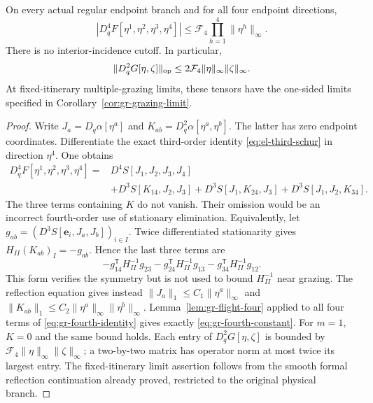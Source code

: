 \begin{theorem}
\label{thm:gr-fourth}
On every actual regular endpoint branch and for all four endpoint
directions,
\begin{equation}\label{eq:gr-fourth-bound}
 |D_q^4F[\eta^1,\eta^2,\eta^3,\eta^4]|
       \le\mathcal F_4\prod_{h=1}^4\|\eta^h\|_\infty.
\end{equation}
There is no interior-incidence cutoff. In particular,
\[
 \|D_q^2G[\eta,\zeta]\|_{\rm op}
       \le2\mathcal F_4\|\eta\|_\infty\|\zeta\|_\infty.
\]
At fixed-itinerary multiple-grazing limits, these tensors have the
one-sided limits specified in Corollary~\ref{cor:gr-grazing-limit}.
\end{theorem}
\begin{proof}
Write $J_a=D_q\alpha[\eta^a]$ and
$K_{ab}=D_q^2\alpha[\eta^a,\eta^b]$. The latter has zero endpoint
coordinates. Differentiate the exact third-order identity
\eqref{eq:el-third-schur} in direction $\eta^4$. One obtains
\begin{equation}\label{eq:gr-fourth-identity}
 \begin{split}
 D_q^4F[\eta^1,\eta^2,\eta^3,\eta^4]
 ={}&D^4S[J_1,J_2,J_3,J_4]\\
 &+D^3S[K_{14},J_2,J_3]
  +D^3S[J_1,K_{24},J_3]
  +D^3S[J_1,J_2,K_{34}].
 \end{split}
\end{equation}
The three terms containing $K$ do not vanish. Their omission would
be an incorrect fourth-order use of stationary elimination.
Equivalently, let $g_{ab}=(D^3S[\mathbf e_i,J_a,J_b])_{i\in I}$.
Twice differentiated stationarity gives
$H_{II}(K_{ab})_I=-g_{ab}$. Hence the last three terms are
\[
 -g_{14}^{\mathsf T}H_{II}^{-1}g_{23}
 -g_{24}^{\mathsf T}H_{II}^{-1}g_{13}
 -g_{34}^{\mathsf T}H_{II}^{-1}g_{12}.
\]
This form verifies the symmetry but is not used to bound
$H_{II}^{-1}$ near grazing. The reflection equation gives instead
$\|J_a\|_1\le C_1\|\eta^a\|_\infty$ and
$\|K_{ab}\|_1\le C_2\|\eta^a\|_\infty\|\eta^b\|_\infty$.
Lemma~\ref{lem:gr-flight-four} applied to all four terms of
\eqref{eq:gr-fourth-identity} gives exactly
\eqref{eq:gr-fourth-constant}. For $m=1$, $K=0$ and the same bound
holds. Each entry of $D_q^2G[\eta,\zeta]$ is bounded by
$\mathcal F_4\|\eta\|_\infty\|\zeta\|_\infty$; a two-by-two
matrix has operator norm at most twice its largest entry.
The fixed-itinerary limit assertion follows from the smooth formal
reflection continuation already proved, restricted to the original
physical branch.
\end{proof}

